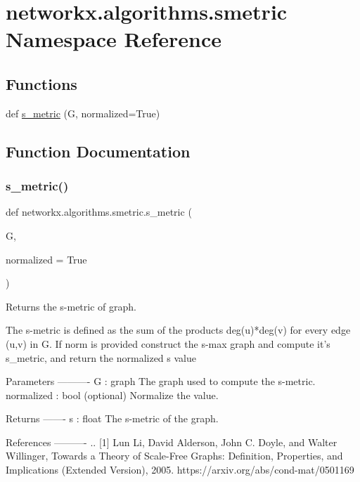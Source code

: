 \hypertarget{namespacenetworkx_1_1algorithms_1_1smetric}{}\section{networkx.\+algorithms.\+smetric Namespace Reference}
\label{namespacenetworkx_1_1algorithms_1_1smetric}
\subsection*{Functions}
\begin{DoxyCompactItemize}
\item 
def \hyperlink{namespacenetworkx_1_1algorithms_1_1smetric_ad11a91141ba017f7538a39f2a3ee306f}{s\+\_\+metric} (G, normalized=True)
\end{DoxyCompactItemize}


\subsection{Function Documentation}
\mbox{\label{namespacenetworkx_1_1algorithms_1_1smetric_ad11a91141ba017f7538a39f2a3ee306f}} 
\subsubsection{\texorpdfstring{s\+\_\+metric()}{s\_metric()}}
{\footnotesize\ttfamily def networkx.\+algorithms.\+smetric.\+s\+\_\+metric (\begin{DoxyParamCaption}\item[{}]{G,  }\item[{}]{normalized = {\ttfamily True} }\end{DoxyParamCaption})}

\begin{DoxyVerb}Returns the s-metric of graph.

The s-metric is defined as the sum of the products deg(u)*deg(v)
for every edge (u,v) in G. If norm is provided construct the
s-max graph and compute it's s_metric, and return the normalized
s value

Parameters
----------
G    : graph
       The graph used to compute the s-metric.
normalized : bool (optional)
       Normalize the value.

Returns
-------
s : float
    The s-metric of the graph.

References
----------
.. [1] Lun Li, David Alderson, John C. Doyle, and Walter Willinger,
       Towards a Theory of Scale-Free Graphs:
       Definition, Properties, and  Implications (Extended Version), 2005.
       https://arxiv.org/abs/cond-mat/0501169
\end{DoxyVerb}
 
